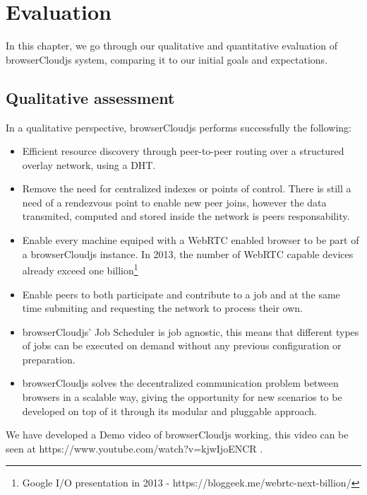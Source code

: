 
%
%

\section{Evaluation}

In this chapter, we go through our qualitative and quantitative evaluation of browserCloudjs system, comparing it to our initial goals and expectations.

\subsection{Qualitative assessment}

In a qualitative perspective, browserCloudjs performs successfully the following:

\begin{itemize}
    \item Efficient resource discovery through peer-to-peer routing over a structured overlay network, using a DHT.
    \item Remove the need for centralized indexes or points of control. There is still a need of a rendezvous point to enable new peer joins, however the data transmited, computed and stored inside the network is peers responsability.
    \item Enable every machine equiped with a WebRTC enabled browser to be part of a browserCloudjs instance. In 2013, the number of WebRTC capable devices already exceed one billion\footnote{Google I/O presentation in 2013 - https://bloggeek.me/webrtc-next-billion/}
    \item Enable peers to both participate and contribute to a job and at the same time submiting and requesting the network to process their own.
    \item browserCloudjs' Job Scheduler is job agnostic, this means that different types of jobs can be executed on demand without any previous configuration or preparation.
    \item browserCloudjs solves the decentralized communication problem between browsers in a scalable way, giving the opportunity for new scenarios to be developed on top of it through its modular and pluggable approach.
\end{itemize}

We have developed a Demo video of browserCloudjs working, this video can be seen at https://www.youtube.com/watch?v=kjwIjoENCR .

